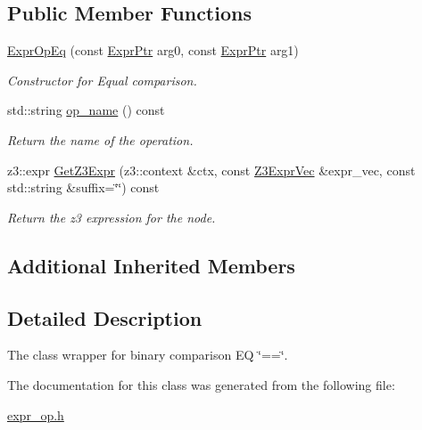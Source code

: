 \subsection*{Public Member Functions}
\begin{DoxyCompactItemize}
\item 
\mbox{\label{classilang_1_1_expr_op_eq_a787a23e64e9f2f4ecf89f7e73ef26b7d}} 
\mbox{\hyperlink{classilang_1_1_expr_op_eq_a787a23e64e9f2f4ecf89f7e73ef26b7d}{Expr\+Op\+Eq}} (const \mbox{\hyperlink{classilang_1_1_expr_a85952b6a34620c4c8cab6bac9c9fdf8c}{Expr\+Ptr}} arg0, const \mbox{\hyperlink{classilang_1_1_expr_a85952b6a34620c4c8cab6bac9c9fdf8c}{Expr\+Ptr}} arg1)
\begin{DoxyCompactList}\small\item\em Constructor for Equal comparison. \end{DoxyCompactList}\item 
\mbox{\label{classilang_1_1_expr_op_eq_a938401b6a76ab3dfc8c01f1c4d1ba464}} 
std\+::string \mbox{\hyperlink{classilang_1_1_expr_op_eq_a938401b6a76ab3dfc8c01f1c4d1ba464}{op\+\_\+name}} () const
\begin{DoxyCompactList}\small\item\em Return the name of the operation. \end{DoxyCompactList}\item 
\mbox{\label{classilang_1_1_expr_op_eq_a9437e025c7d3f78e507e85798785f49c}} 
z3\+::expr \mbox{\hyperlink{classilang_1_1_expr_op_eq_a9437e025c7d3f78e507e85798785f49c}{Get\+Z3\+Expr}} (z3\+::context \&ctx, const \mbox{\hyperlink{namespaceilang_adc4eee919aa24fff882d03a48d733c19}{Z3\+Expr\+Vec}} \&expr\+\_\+vec, const std\+::string \&suffix=\char`\"{}\char`\"{}) const
\begin{DoxyCompactList}\small\item\em Return the z3 expression for the node. \end{DoxyCompactList}\end{DoxyCompactItemize}
\subsection*{Additional Inherited Members}


\subsection{Detailed Description}
The class wrapper for binary comparison EQ \char`\"{}==\char`\"{}. 

The documentation for this class was generated from the following file\+:\begin{DoxyCompactItemize}
\item 
\mbox{\hyperlink{expr__op_8h}{expr\+\_\+op.\+h}}\end{DoxyCompactItemize}
